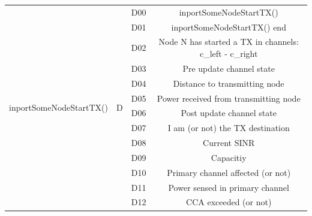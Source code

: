 \documentclass[a4paper]{article}
\begin{document}
\begin{table}[]
\begin{tabular}{|c|c|c|c|}
		\multirow{14}{*}{inportSomeNodeStartTX()}  & \multirow{14}{*}{D} & D00               & inportSomeNodeStartTX()                                 \\ \cline{3-4} 
		                                           &                     & D01               & inportSomeNodeStartTX() end                             \\ \cline{3-4} 
		                                           &                     & D02               & Node N has started a TX in channels: c\_left - c\_right \\ \cline{3-4} 
		                                           &                     & D03               & Pre update channel state                                \\ \cline{3-4} 
		                                           &                     & D04               & Distance to transmitting node                           \\ \cline{3-4} 
		                                           &                     & D05               & Power received from transmitting node                   \\ \cline{3-4} 
		                                           &                     & D06               & Post update channel state                               \\ \cline{3-4} 
		                                           &                     & D07               & I am (or not) the TX destination                        \\ \cline{3-4} 
		                                           &                     & D08               & Current SINR                                            \\ \cline{3-4} 
		                                           &                     & D09               & Capacitiy                                               \\ \cline{3-4} 
		                                           &                     & D10               & Primary channel affected (or not)                       \\ \cline{3-4} 
		                                           &                     & D11               & Power sensed in primary channel                         \\ \cline{3-4} 
		                                           &                     & D12               & CCA exceeded (or not)                                   \\ \cline{3-4} 

\end{tabular}
\end{table}
\end{document}

